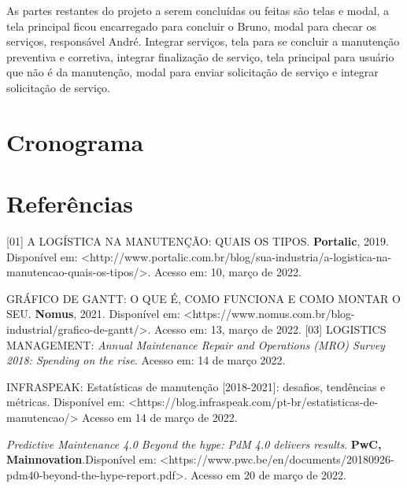 \documentclass[%
  a4paper,%
  12pt,%
  english,%
  brazilian,%
]{article}
\begin{document}
As partes restantes do projeto a serem concluídas ou feitas são telas e modal, a tela principal ficou encarregado para concluir o Bruno, modal para checar os serviços, responsável André. Integrar serviços, tela para se concluir a manutenção preventiva e corretiva, integrar finalização de serviço, tela principal para usuário que não é da manutenção, modal para enviar solicitação de serviço e integrar solicitação de serviço.



\section{Cronograma}%


\section{Referências}%
[01] A LOGÍSTICA NA MANUTENÇÃO: QUAIS OS TIPOS. \textbf{Portalic}, 2019. Disponível em: <http://www.portalic.com.br/blog/sua-industria/a-logistica-na-manutencao-quais-os-tipos/>. Acesso em: 10, março de 2022.\par
[02] GRÁFICO DE GANTT: O QUE É, COMO FUNCIONA E COMO MONTAR O SEU. \textbf{Nomus}, 2021. Disponível em: <https://www.nomus.com.br/blog-industrial/grafico-de-gantt/>. Acesso em: 13, março de 2022.
[03] LOGISTICS MANAGEMENT: \textit{Annual Maintenance Repair and Operations (MRO) Survey 2018: Spending on the rise}. Acesso em: 14 de março 2022.\par
[04] INFRASPEAK: Estatísticas de manutenção [2018-2021]: desafios, tendências e métricas. Disponível em: <https://blog.infraspeak.com/pt-br/estatisticas-de-manutencao/> Acesso em 14 de março de 2022.\par
[05]\textit{Predictive Maintenance 4.0 Beyond the hype: PdM 4.0 delivers results}. \textbf{PwC, Mainnovation}.Disponível em: <https://www.pwc.be/en/documents/20180926-pdm40-beyond-the-hype-report.pdf>. Acesso em 20 de março de 2022.

\end{document}
